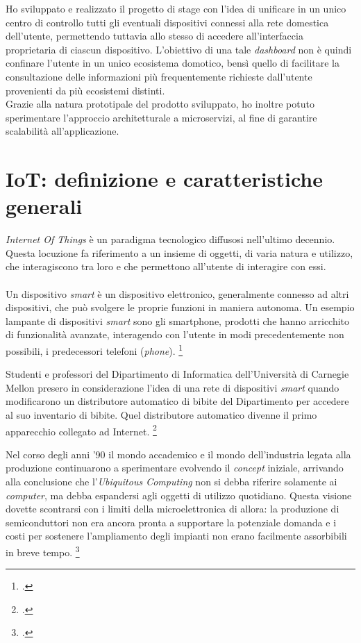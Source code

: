 Ho sviluppato e realizzato il progetto di stage con l'idea di unificare in un unico centro di controllo tutti gli eventuali dispositivi connessi alla rete domestica dell'utente, permettendo tuttavia allo stesso di accedere all'interfaccia proprietaria di ciascun dispositivo.
L'obiettivo di una tale \emph{dashboard} non è quindi confinare l'utente in un unico ecosistema domotico,
bensì quello di facilitare la consultazione delle informazioni più frequentemente richieste dall'utente provenienti da più ecosistemi distinti. \\
Grazie alla natura prototipale del prodotto sviluppato, ho inoltre potuto sperimentare l'approccio architetturale a microservizi, al fine di garantire scalabilità all'applicazione.

\section{IoT: definizione e caratteristiche generali}
\label{intro-iot}

\emph{Internet Of Things} è un paradigma tecnologico diffusosi nell'ultimo decennio. Questa locuzione fa riferimento a un insieme di oggetti,
di varia natura e utilizzo, che interagiscono tra loro e che permettono all'utente di interagire con essi. \\ \\

Un dispositivo \emph{smart} è un dispositivo elettronico, generalmente connesso ad altri dispositivi, che può svolgere le proprie funzioni in maniera autonoma.
Un esempio lampante di dispositivi \emph{smart} sono gli smartphone, prodotti che hanno arricchito di funzionalità avanzate, interagendo con l'utente in modi precedentemente non possibili, i predecessori telefoni (\emph{phone}).
\footcite{site:smart-device}

Studenti e professori del Dipartimento di Informatica dell'Università di Carnegie Mellon presero in considerazione l'idea di una rete di dispositivi \emph{smart} quando modificarono un distributore automatico di bibite del Dipartimento per accedere al suo inventario di bibite. Quel distributore automatico divenne il primo apparecchio collegato ad Internet.
\footcite{site:mellon-uni}

Nel corso degli anni '90 il mondo accademico e il mondo dell'industria legata alla produzione continuarono a sperimentare evolvendo il \textit{concept} iniziale, arrivando alla conclusione che l'\textit{Ubiquitous Computing} non si debba riferire solamente ai \textit{computer}, ma debba espandersi agli oggetti di utilizzo quotidiano. Questa visione dovette scontrarsi con i limiti della microelettronica di allora: la produzione di semiconduttori non era ancora pronta a supportare la potenziale domanda e i costi per sostenere l'ampliamento degli impianti non erano facilmente assorbibili in breve tempo.
\footcite{site:mit-weiser}

